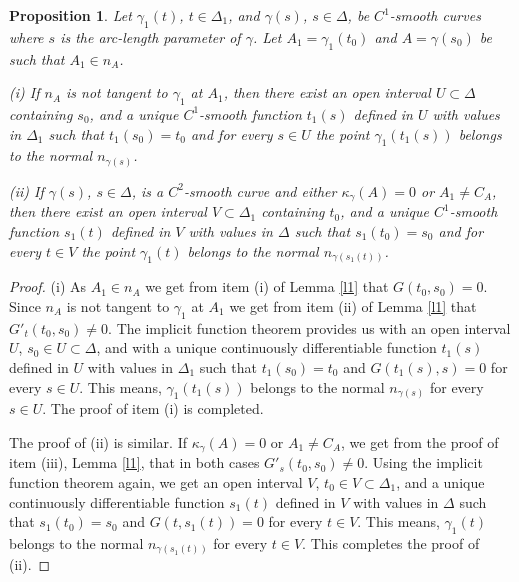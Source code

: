 \documentclass[a4paper,12pt]{amsart}
\newtheorem{prop}[thm]{Proposition}
\def\g{\gamma}
\begin{document}
\begin{prop} \label{nnorm1}
 Let $\g_1(t)$, $t \in \Delta_1$, and $\g(s)$,
 $s \in \Delta$, be  $C^1$-smooth curves where  $s$ is the arc-length parameter of
 $\g$. Let $A_1= \g_1(t_0)$ and $A= \g(s_0)$ be such that $A_1 \in n_A$.

(i) If $n_A$ is not tangent to $\g_1$ at $A_1$,
then there exist an open interval $U \subset \Delta$ containing $s_0$, and a unique $C^1$-smooth function $t_1(s)$ defined in $ U$ with values in
$\Delta_1$ such that $t_1(s_0) = t_0$ and for every
$s \in U$ the point $\g_1(t_1(s))$ belongs to the normal $n_{\g(s)}$.

(ii) If $\g(s)$, $s \in \Delta$, is a $C^2$-smooth curve and either $\kappa_{\g}(A)=0$ or $A_1\neq C_A$, then there exist an open interval $V \subset \Delta_1$ containing $t_0$, and a unique $C^1$-smooth function $s_1(t)$ defined in $V$ with values in
$\Delta$ such that $s_1(t_0) = s_0$ and for every
$t \in V$ the point $\g_1(t)$ belongs to the normal $n_{\g(s_1(t))}$.
\end{prop}

\begin{proof}
(i) As $A_1 \in n_A$ we get from item (i) of Lemma \ref{l1} that
$G(t_0,s_0)=0$. Since $n_A$ is not tangent to $\g_1$ at $A_1$ we get from item (ii) of Lemma \ref{l1} that $G'_t(t_0,s_0) \neq 0$.
The implicit function theorem provides us with an open interval $U$, $s_0 \in U \subset \Delta$, and with a unique continuously differentiable function $t_1(s)$ defined in $U$ with values in
$\Delta_1$ such that $t_1(s_0)=t_0$ and $G(t_1(s), s) =0$ for every $s \in U$. This means,  $\g_1(t_1(s))$ belongs to the normal $n_{\g(s)}$ for every $s \in U$. The proof of item (i) is completed.

The proof of (ii) is similar. If $\kappa_{\g}(A)=0$ or $A_1\neq C_A$, we get from the proof of item (iii), Lemma \ref{l1},  that in both cases $G'_s(t_0,s_0) \neq 0$. Using the implicit function theorem again, we get an open interval $V $, $t_0 \in V \subset \Delta_1$, and a unique continuously differentiable function $s_1(t)$ defined in $V$ with values in $\Delta$ such that $s_1(t_0)=s_0$ and
$G(t,s_1(t)) =0$ for every $t\in V$.
This means, $\g_1(t)$ belongs to the normal $n_{\g(s_1(t))}$ for every $t \in V$. This completes the proof of (ii).

\end{proof}
\end{document}
